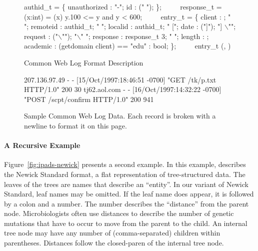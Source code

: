
\begin{figure}
{\small
\begin{code}
authid\_t = \Punion{} \{
  unauthorized : "-";
  id           : \Pstring (" ");
\};
\(\qquad\)
response\_t =
  \Pfun(x:int) =
   (x) \Pwhere{} y.100 <= y and y < 600;
\(\qquad\)
entry\_t = \Pstruct{} \{
  client   : \Pip{};             " ";
  remoteid : authid\_t;        " ";
  localid  : authid\_t;        " [";
  date     : \Pdate("]");      "] \(\backslash\)"";
  request  : \Pstring("\(\backslash\)"");   "\(\backslash\)" ";
  response : response\_t 3;    " "; 
  length   : \Puint{};
  academic : \Pcompute (getdomain client) == "edu" : bool;
\};
\(\qquad\)
entry\_t \Parray{}(\Peor, \Peof)
\end{code}

\caption{\ipads{} Common Web Log Format Description}
\label{fig:ipads-clf}
}
\end{figure}

\begin{figure}
{\small
\begin{code}
{}207.136.97.49 - - [15/Oct/1997:18:46:51 -0700] 
"GET /tk/p.txt HTTP/1.0" 200 30
tj62.aol.com - - [16/Oct/1997:14:32:22 -0700] 
"POST /scpt/confirm HTTP/1.0" 200 941
\end{code}
\caption{Sample Common Web Log Data. Each record is broken with a
  newline to format it on this page.}
\label{fig:ipads-clf-data}
}
\end{figure}

\paragraph*{A Recursive \ipads{} Example}
Figure~\ref{fig:ipads-newick} presents a second \ipads{} example.
In this example, \ipads{} describes the Newick Standard format, a flat
representation of tree-structured data.  The leaves of the trees
are names that describe an ``entity''.   In our variant of Newick Standard, 
leaf names may be omitted.  If the leaf name does appear,
it is followed by a colon and a number.  The number describes the ``distance''
from the parent node.  Microbiologists often use
distances to describe the
number of genetic mutations that have to occur to move from the parent 
to the child.  An internal tree node may have any number of (comma-separated)
children within parentheses.  Distances follow the closed-paren
of the internal tree node.

